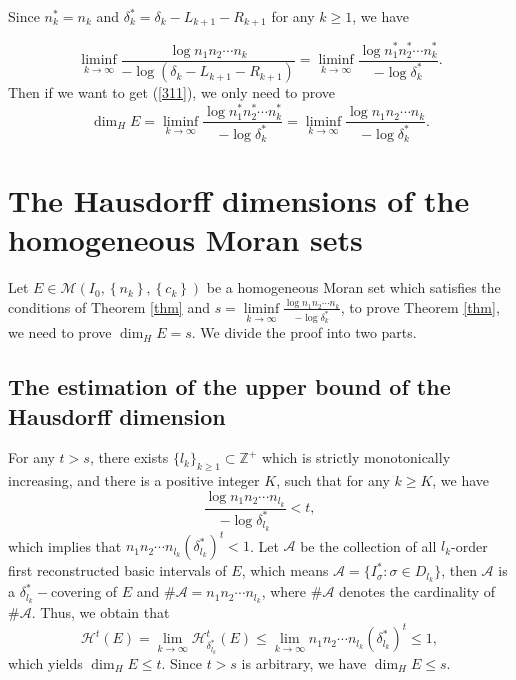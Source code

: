 \documentclass[reqno]{amsart}
\theoremstyle{plain}
\theoremstyle{definition}
\theoremstyle{remark}
\numberwithin{equation}{section} \DeclareMathOperator\intr{int}
\begin{document}
Since  $n^{*}_{k}=n_{k}$ and $\delta^{*}_{k}=\delta_{k}-L_{k+1}-R_{k+1}$ for any $k\ge 1$, we have

\begin{equation}
\liminf\limits_{k \to\infty}  \frac{\log n_1n_2\cdots n_k}{-\log(\delta_k-L_{k+1}-R_{k+1})}=\liminf\limits_{k \to\infty}  \frac{\log n^{*}_1n^{*}_2\cdots n^{*}_k}{-\log\delta^*_k}.\nonumber
\end{equation}
Then if we want  to get (\ref{311}), we only need to prove
\begin{equation*}
\dim_{H}E=\liminf\limits_{k \to\infty}  \frac{\log n^{*}_1n^{*}_2\cdots n^{*}_k}{-\log\delta^*_k}=\liminf\limits_{k \to\infty}  \frac{\log n_1n_2\cdots n_k}{-\log\delta^*_k}.
\end{equation*}


\bigskip

\section{The Hausdorff dimensions of the homogeneous Moran sets}
Let $E\in \mathcal{M}(I_{0},\left\{n_{k}\right\},\left\{c_{k}\right\})$  be a homogeneous Moran set which satisfies the conditions of Theorem \ref{thm} and $s=\liminf\limits_{k \to\infty}  \frac{\log n_1n_2\cdots n_k}{-\log\delta^*_k}$, to prove Theorem \ref{thm}, we need to prove $\dim_{H}E=s$. We divide the proof  into two parts.
\subsection{The estimation of   the upper bound of the Hausdorff dimension}

For any $t>s$, there exists  $\{l_k\}_{k\ge 1}\subset \mathbb{Z}^{+}$ which is strictly monotonically increasing, and there is a positive integer $K$, such that for any $k\ge K$, we have
\begin{equation}
\frac{\log n_1n_2\cdots n_{l_k}}{-\log\delta^*_{l_k}}<t,\nonumber
\end{equation}
which implies that $n_1n_2\cdots n_{l_k}{(\delta^*_{l_k})}^t<1$. Let $\mathcal{A}$ be the collection of all  $l_k$-order first reconstructed basic intervals of $E$, which means $\mathcal{A}=\{I_{\sigma}^{*}:\sigma \in D_{l_k}\}$, then $\mathcal{A}$ is a $\delta^*_{l_k}-$covering of $E$ and $\# \mathcal{A}=n_1n_2\cdots n_{l_k}$, where $\# \mathcal{A}$ denotes the cardinality of $\# \mathcal{A}$. Thus, we obtain that
\begin{equation}
\mathcal{H}^t(E)=\lim_{k \to\infty}\mathcal{H}^{t}_{\delta^*_{l_k}}(E)\le \lim_{k \to\infty} n_1n_2\cdots n_{l_k}{(\delta^*_{l_k})}^t\le 1,\nonumber
\end{equation}
which yields $\dim_HE\le t$. Since $t>s$ is arbitrary, we have $\dim_{H}E\le s$.
\end{document}
